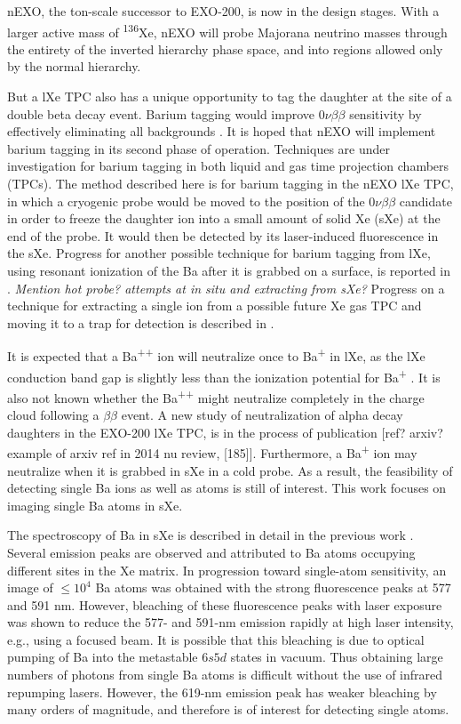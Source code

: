 \documentclass[aps,pra,reprint,superscriptaddress]{revtex4-1}
\begin{document}
nEXO, the ton-scale successor to EXO-200, is now in the design stages.  With a larger active mass of \textsuperscript{136}Xe, nEXO will probe Majorana neutrino masses through the entirety of the inverted hierarchy phase space, and into regions allowed only by the normal hierarchy.

But a lXe TPC also has a unique opportunity to tag the daughter at the site of a double beta decay event.  Barium tagging would improve $0\nu\beta\beta$ sensitivity by effectively eliminating all backgrounds \cite{Moe1991}.  It is hoped that nEXO will implement barium tagging in its second phase of operation.  Techniques are under investigation for barium tagging in both liquid and gas time projection chambers (TPCs).  The method described here is for barium tagging in the nEXO lXe TPC, in which a cryogenic probe would be moved to the position of the $0\nu\beta\beta$ candidate in order to freeze the daughter ion into a small amount of solid Xe (sXe) at the end of the probe.  It would then be detected by its laser-induced fluorescence in the sXe.  Progress for another possible technique for barium tagging from lXe, using resonant ionization of the Ba after it is grabbed on a surface, is reported in \cite{Twelker2014}.  \emph{{\color{gray}Mention hot probe?  attempts at in situ and extracting from sXe?}}  Progress on a technique for extracting a single ion from a possible future Xe gas TPC and moving it to a trap for detection is described in \cite{Brunner2015}.

It is expected that a Ba\textsuperscript{++} ion will neutralize once to Ba\textsuperscript{+} in lXe, as the lXe conduction band gap is slightly less than the ionization potential for Ba\textsuperscript{+} \cite{Moe1991}.  It is also not known whether the Ba\textsuperscript{++} might neutralize completely in the charge cloud following a $\beta\beta$ event.  A new study of neutralization of alpha decay daughters in the EXO-200 lXe TPC, is in the process of publication [ref? arxiv? example of arxiv ref in 2014 nu review, [185]].  Furthermore, a Ba\textsuperscript{+} ion may neutralize when it is grabbed in sXe in a cold probe.  As a result, the feasibility of detecting single Ba ions as well as atoms is still of interest.  This work focuses on imaging single Ba atoms in sXe.

The spectroscopy of Ba in sXe is described in detail in the previous work \cite{Mong2015}.  Several emission peaks are observed and attributed to Ba atoms occupying different sites in the Xe matrix.  In progression toward single-atom sensitivity, an image of $\leq 10^4$ Ba atoms was obtained with the strong fluorescence peaks at 577 and 591 nm.  However, bleaching of these fluorescence peaks with laser exposure was shown to reduce the 577- and 591-nm emission rapidly at high laser intensity, e.g., using a focused beam.  It is possible that this bleaching is due to optical pumping of Ba into the metastable $6s5d$ states in vacuum.  Thus obtaining large numbers of photons from single Ba atoms is difficult without the use of infrared repumping lasers.  However, the 619-nm emission peak has weaker bleaching by many orders of magnitude, and therefore is of interest for detecting single atoms.
\end{document}

